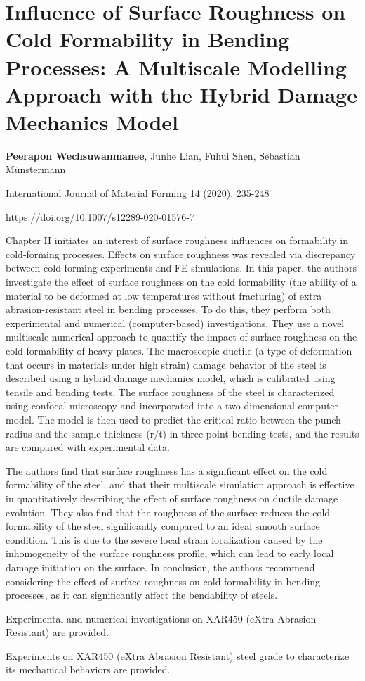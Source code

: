 \chapter[roughness]{Influence of Surface Roughness on Cold Formability in Bending Processes: A Multiscale Modelling Approach with the Hybrid Damage Mechanics Model}\label{ch:roughness}
\begin{center}

    \textbf{Peerapon Wechsuwanmanee}, Junhe Lian, Fuhui Shen, Sebastian Münstermann
    
    \vspace{20pt}
    
    International Journal of Material Forming 14 (2020), 235-248
    
    \vspace{20pt}
    
    \url{https://doi.org/10.1007/s12289-020-01576-7}
    
    \vspace{40pt}
    
\end{center}
Chapter II initiates an interest of surface roughness influences on formability in cold-forming processes. Effects on surface roughness was revealed via discrepancy between cold-forming experiments and FE simulations. In this paper, the authors investigate the effect of surface roughness on the cold formability (the ability of a material to be deformed at low temperatures without fracturing) of extra abrasion-resistant steel in bending processes. To do this, they perform both experimental and numerical (computer-based) investigations. They use a novel multiscale numerical approach to quantify the impact of surface roughness on the cold formability of heavy plates. The macroscopic ductile (a type of deformation that occurs in materials under high strain) damage behavior of the steel is described using a hybrid damage mechanics model, which is calibrated using tensile and bending tests. The surface roughness of the steel is characterized using confocal microscopy and incorporated into a two-dimensional computer model. The model is then used to predict the critical ratio between the punch radius and the sample thickness (r/t) in three-point bending tests, and the results are compared with experimental data.

The authors find that surface roughness has a significant effect on the cold formability of the steel, and that their multiscale simulation approach is effective in quantitatively describing the effect of surface roughness on ductile damage evolution. They also find that the roughness of the surface reduces the cold formability of the steel significantly compared to an ideal smooth surface condition. This is due to the severe local strain localization caused by the inhomogeneity of the surface roughness profile, which can lead to early local damage initiation on the surface. In conclusion, the authors recommend considering the effect of surface roughness on cold formability in bending processes, as it can significantly affect the bendability of steels.

Experimental and numerical investigations on XAR450 (eXtra Abrasion Resistant) are provided.

Experiments on XAR450 (eXtra Abrasion Resistant) steel grade to characterize its mechanical behaviors are provided.